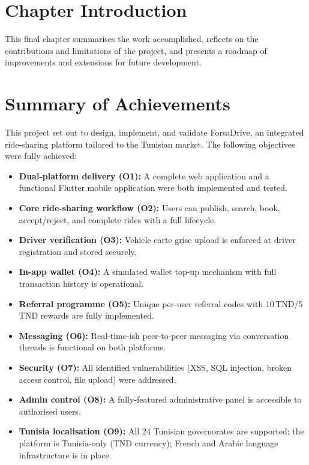 \documentclass[12pt,a4paper,openright]{report}
\begin{document}
\section*{Chapter Introduction}
This final chapter summarises the work accomplished, reflects on the contributions and limitations of the project, and presents a roadmap of improvements and extensions for future development.

\section{Summary of Achievements}

This project set out to design, implement, and validate ForsaDrive, an integrated ride-sharing platform tailored to the Tunisian market. The following objectives were fully achieved:

\begin{itemize}[noitemsep]
    \item \textbf{Dual-platform delivery (O1):} A complete web application and a functional Flutter mobile application were both implemented and tested.
    \item \textbf{Core ride-sharing workflow (O2):} Users can publish, search, book, accept/reject, and complete rides with a full lifecycle.
    \item \textbf{Driver verification (O3):} Vehicle carte grise upload is enforced at driver registration and stored securely.
    \item \textbf{In-app wallet (O4):} A simulated wallet top-up mechanism with full transaction history is operational.
    \item \textbf{Referral programme (O5):} Unique per-user referral codes with 10\,TND/5\,TND rewards are fully implemented.
    \item \textbf{Messaging (O6):} Real-time-ish peer-to-peer messaging via conversation threads is functional on both platforms.
    \item \textbf{Security (O7):} All identified vulnerabilities (XSS, SQL injection, broken access control, file upload) were addressed.
    \item \textbf{Admin control (O8):} A fully-featured administrative panel is accessible to authorised users.
    \item \textbf{Tunisia localisation (O9):} All 24 Tunisian governorates are supported; the platform is Tunisia-only (TND currency); French and Arabic language infrastructure is in place.
\end{itemize}
\end{document}
